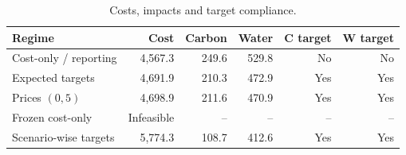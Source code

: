 \begin{table}[H]
\centering\small
\caption{Costs, impacts and target compliance.}\label{tab:regimes}
\begin{tabular}{@{}lrrrrr@{}}
\toprule
Regime & Cost & Carbon & Water & C target & W target \\
\midrule
Cost-only / reporting & 4,567.3 & 249.6 & 529.8 & No & No \\
Expected targets & 4,691.9 & 210.3 & 472.9 & Yes & Yes \\
Prices $(0,5)$ & 4,698.9 & 211.6 & 470.9 & Yes & Yes \\
Frozen cost-only & Infeasible & -- & -- & -- & -- \\
Scenario-wise targets & 5,774.3 & 108.7 & 412.6 & Yes & Yes \\
\bottomrule
\end{tabular}
\end{table}
